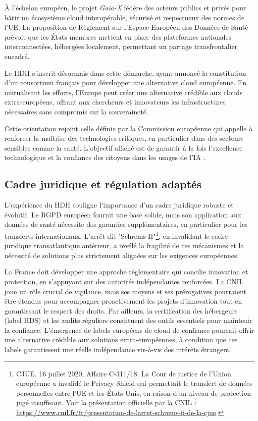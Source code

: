 \documentclass[10pt,a4paper]{article}
\begin{document}
À l'échelon européen, le projet \textit{Gaia-X} fédère des acteurs publics et privés pour bâtir un écosystème cloud interopérable, sécurisé et respectueux des normes de l'UE. La proposition de Règlement sur l'Espace Européen des Données de Santé prévoit que les États membres mettent en place des plateformes nationales interconnectées, hébergées localement, permettant un partage transfrontalier encadré.

Le HDH s'inscrit désormais dans cette démarche, ayant annoncé la constitution d'un consortium français pour développer une alternative cloud européenne. En mutualisant les efforts, l'Europe peut créer une alternative crédible aux clouds extra-européens, offrant aux chercheurs et innovateurs les infrastructures nécessaires sans compromis sur la souveraineté.

Cette orientation rejoint celle définie par la Commission européenne qui appelle à renforcer la maîtrise des technologies critiques, en particulier dans des secteurs sensibles comme la santé. L’objectif affiché est de garantir à la fois l’excellence technologique et la confiance des citoyens dans les usages de l’IA \parencite{european2020white}.

\subsection{Cadre juridique et régulation adaptés}

L'expérience du HDH souligne l'importance d'un cadre juridique robuste et évolutif. Le RGPD européen fournit une base solide, mais son application aux données de santé nécessite des garanties supplémentaires, en particulier pour les transferts internationaux. L'arrêt dit "Schrems II"\footnote{CJUE, 16 juillet 2020, Affaire C-311/18. La Cour de justice de l’Union européenne a invalidé le Privacy Shield qui permettait le transfert de données personnelles entre l’UE et les États-Unis, en raison d’un niveau de protection jugé insuffisant. Voir la présentation officielle par la CNIL : \url{https://www.cnil.fr/fr/presentation-de-larret-schrems-ii-de-la-cjue}.}, en invalidant le cadre juridique transatlantique antérieur, a révélé la fragilité de ces mécanismes et la nécessité de solutions plus strictement alignées sur les exigences européennes.


La France doit développer une approche réglementaire qui concilie innovation et protection, en s'appuyant sur des autorités indépendantes renforcées. La CNIL joue un rôle crucial de vigilance, mais ses moyens et ses prérogatives pourraient être étendus pour accompagner proactivement les projets d'innovation tout en garantissant le respect des droits. Par ailleurs, la certification des hébergeurs (label HDS) et les audits réguliers constituent des outils essentiels pour maintenir la confiance. L'émergence de labels européens de cloud de confiance pourrait offrir une alternative crédible aux solutions extra-européennes, à condition que ces labels garantissent une réelle indépendance vis-à-vis des intérêts étrangers.
\end{document}
